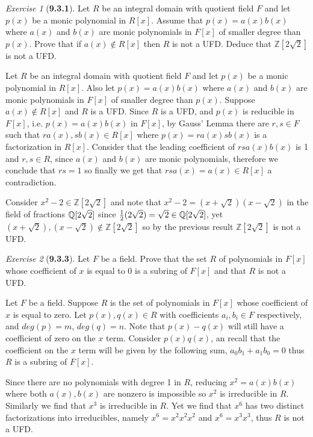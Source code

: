 \documentclass[12pt]{amsart}
\makeatletter
\theoremstyle{remark}
\newtheorem*{exercise}{Exercise}%
\def\ZZ{\ensuremath{\mathbb Z}}
\def\QQ{{\ensuremath\mathbb Q}}
\renewenvironment{proof}[1][\proofname]{\par\doublespacing
  \pushQED{\qed}%
  \normalfont \topsep6\p@\@plus6\p@\relax
  \list{}{%
    \settowidth{\leftmargin}{\itshape\proofname:\hskip\labelsep}%
    \setlength{\labelwidth}{0pt}%
    \setlength{\itemindent}{-\leftmargin}%
  }%
  \item[\hskip\labelsep\itshape#1\@addpunct{:}]\ignorespaces
}{%
  \popQED\endlist\@endpefalse
  \singlespacing
}
\theoremstyle{mycomment}
\makeatother
\begin{document}
\begin{exercise}[\textbf{9.3.1}] Let $R$ be an integral domain with quotient field $F$ and let $p(x)$
  be a monic polynomial in $R[x]$. Assume that $p(x) = a(x)b(x)$ where $a(x)$ and $b(x)$ are monic polynomials in $F[x]$
  of smaller degree than $p(x)$. Prove that if $a(x) \not\in R[x] $ then $R$ is not a UFD. Deduce that $\ZZ[2\sqrt{2}]$ is not a UFD.
  \begin{proof} Let $R$ be an integral domain with quotient field $F$ and let $p(x)$
    be a monic polynomial in $R[x]$. Also let $p(x) = a(x)b(x)$ where $a(x)$ and $b(x)$ are monic polynomials in $F[x]$
    of smaller degree than $p(x)$. Suppose $a(x) \not\in R[x] $ and $R$ is a UFD. Since $R$ is a UFD, and $p(x)$ is reducible in 
    $F[x]$, i.e. $p(x) = a(x)b(x)$ in $F[x]$, by Gauss' Lemma there are $r, s \in F$ such that $ra(x), sb(x) \in R[x]$ where 
    $p(x) = ra(x)sb(x)$ is a factorization in $R[x]$. Consider that the leading coefficient of $rsa(x)b(x)$ is 1 and $r, s \in R$, since $a(x)$ and $b(x)$ are monic 
    polynomials, therefore we conclude that $rs = 1$ so finally we get that $rsa(x) = a(x) \in R[x]$ a contradiction.  

    Consider $x^2 - 2 \in \ZZ[2\sqrt{2}]$ and note that $x^2 - 2 = (x + \sqrt{2})(x - \sqrt{2})$ in the field of fractions $\QQ[2\sqrt{2}]$ since $\frac{1}{2}(2\sqrt{2}) = \sqrt{2} \in \QQ[2\sqrt{2}]$, yet $(x + \sqrt{2}), (x - \sqrt{2}) \not\in \ZZ[2\sqrt{2}]$ so by the previous result $\ZZ[2\sqrt{2}]$ is not a UFD.
    \end{proof}
\end{exercise}
\vspace{.5in}



\begin{exercise}[\textbf{9.3.3}] Let $F$ be a field. Prove that the set $R$ of polynomials in $F[x]$ whose coefficient of $x$
is equal to 0 is a subring of $F[x]$ and that $R$ is not a UFD.
    \begin{proof} Let $F$ be a field. Suppose $R$ is the set of polynomials in $F[x]$ whose coefficient of $x$ is equal to zero. 
      Let $p(x), q(x) \in R$ with coefficients $a_i, b_i \in F$ respectively, and $deg(p) = m$, $deg(q) = n$. Note that $p(x) - q(x)$ will still have a coefficient of zero on the $x$ term.
      Consider $p(x)q(x)$, an recall that the coefficient on the $x$ term will be given by the following sum, $a_0b_1 + a_1b_0 = 0$ thus $R$ is a subring of $F[x]$.
      
      Since there are no polynomials with degree 1 in $R$, reducing $x^2 = a(x)b(x)$ where both $a(x), b(x)$ are nonzero is impossible so 
      $x^2$ is irreducible in $R$. Similarly we find that $x^3$ is irreducible in $R$. Yet we find that $x^6$ has two distinct factorizations 
      into irreducibles, namely $x^6 = x^2x^2x^2$ and $x^6 = x^3x^3$, thus $R$ is not a UFD.  
        \end{proof}
\end{exercise}
\vspace{.5in}
\end{document}
